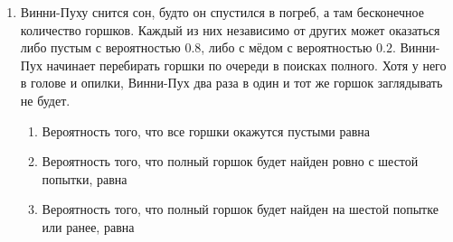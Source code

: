 \begin{enumerate}

\item Винни-Пуху снится сон, будто он спустился в погреб, а там бесконечное
количество горшков. Каждый из них независимо от других может оказаться либо
пустым с вероятностью $0.8$, либо с мёдом с вероятностью $0.2$. Винни-Пух начинает
перебирать горшки по очереди в поисках полного. Хотя у него в голове и опилки,
Винни-Пух два раза в один и тот же горшок заглядывать не будет.
\begin{enumerate}
\item Вероятность того, что все горшки окажутся пустыми равна \underline{\hspace{2cm}}
\item Вероятность того, что полный горшок будет найден ровно с шестой попытки, равна \underline{\hspace{2cm}}
\item Вероятность того, что полный горшок будет найден на шестой попытке или ранее, равна \underline{\hspace{2cm}}
\end{enumerate}


\end{enumerate}
